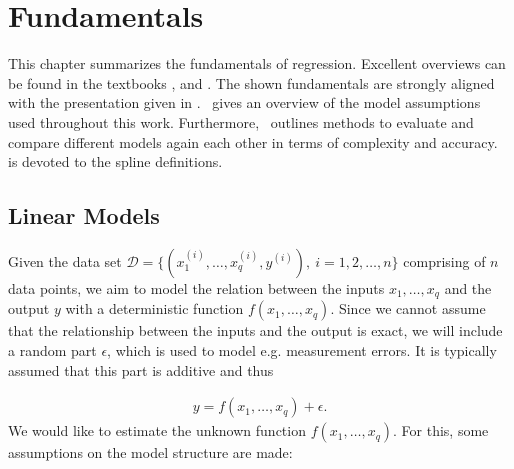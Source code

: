 
\chapter{Fundamentals} \label{cha:fundamentals}

This chapter summarizes the fundamentals of regression. Excellent overviews can be found in the textbooks \cite{fahrmeir2007regression}, \cite{friedman2001elements} and \cite{wood2017generalized}. The shown fundamentals are strongly aligned with the presentation given in \cite{fahrmeir2007regression}.~ gives an overview of the model assumptions used throughout this work. Furthermore,~ outlines methods to evaluate and compare different models again each other in terms of complexity and accuracy.~ is devoted to the  spline definitions.

\section{Linear Models} \label{sec:LinModel}

Given the data set $\mathcal{D} = \{(x^{(i)}_1, \dots, x^{(i)}_q, y^{(i)}), \ i=1,2, \dots, n\}$ comprising of $n$ data points, we aim to model the relation between the inputs $x_1, \dots, x_q$ and the output $y$ with a deterministic function $f(x_1, \dots, x_q)$. Since we cannot assume that the relationship between the inputs and the output is exact, we will include a random part $\epsilon$, which is used to model e.g. measurement errors. It is typically assumed that this part is additive and thus  

\begin{align} \label{eq:model-structure}
	y = f(x_{1}, \dots, x_{q}) + \epsilon.
\end{align}
%
We would like to estimate the unknown function $f(x_1, \dots, x_q)$. For this, some assumptions on the model structure are made:

